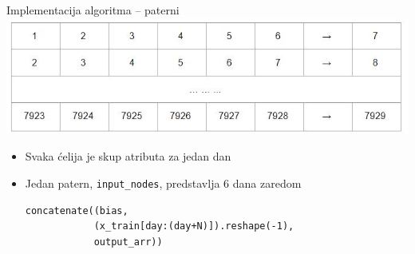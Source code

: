 \documentclass{beamer}
\begin{document}
\begin{frame}[fragile]{Implementacija algoritma -- paterni}
    \includegraphics[scale=0.75]{dani.JPG}
    \begin{itemize}
        \item Svaka ćelija je skup atributa za jedan dan
        \item Jedan patern, \texttt{input\_nodes}, predstavlja 6 dana zaredom
        \begin{verbatim}
concatenate((bias, 
            (x_train[day:(day+N)]).reshape(-1), 
            output_arr))
        \end{verbatim}
    \end{itemize}
\end{frame}
\end{document}
